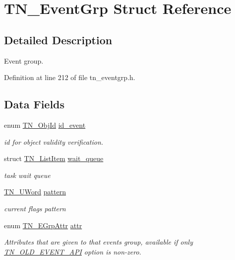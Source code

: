 \hypertarget{structTN__EventGrp}{}\section{T\+N\+\_\+\+Event\+Grp Struct Reference}
\label{structTN__EventGrp}


\subsection{Detailed Description}
Event group. 

Definition at line 212 of file tn\+\_\+eventgrp.\+h.

\subsection*{Data Fields}
\begin{DoxyCompactItemize}
\item 
enum \hyperlink{tn__common_8h_ae779dd1f6735f6e139fb70acd004d976}{T\+N\+\_\+\+Obj\+Id} \hyperlink{structTN__EventGrp_a0bdf55b6117237122efeefcdf6802d37}{id\+\_\+event}
\begin{DoxyCompactList}\small\item\em id for object validity verification. \end{DoxyCompactList}\item 
\mbox{\label{structTN__EventGrp_a93da04331cafe905f9c8b2fa2bad648b}} 
struct \hyperlink{structTN__ListItem}{T\+N\+\_\+\+List\+Item} \hyperlink{structTN__EventGrp_a93da04331cafe905f9c8b2fa2bad648b}{wait\+\_\+queue}
\begin{DoxyCompactList}\small\item\em task wait queue \end{DoxyCompactList}\item 
\mbox{\label{structTN__EventGrp_abf45ee25e11ea46636920be5003cdec2}} 
\hyperlink{tn__arch__example_8h_ab80cba0fe9ffcd9011d53dfeb9e39bf4}{T\+N\+\_\+\+U\+Word} \hyperlink{structTN__EventGrp_abf45ee25e11ea46636920be5003cdec2}{pattern}
\begin{DoxyCompactList}\small\item\em current flags pattern \end{DoxyCompactList}\item 
enum \hyperlink{tn__eventgrp_8h_aca5ed3b60cdaa2e2db8b88f4b5e33d3f}{T\+N\+\_\+\+E\+Grp\+Attr} \hyperlink{structTN__EventGrp_ac247c74950bd8ae6f721ff220e5a2402}{attr}
\begin{DoxyCompactList}\small\item\em Attributes that are given to that events group, available if only {\ttfamily \hyperlink{tn__cfg__default_8h_ac61d5f6a716cdcab205a2c8afbde4242}{T\+N\+\_\+\+O\+L\+D\+\_\+\+E\+V\+E\+N\+T\+\_\+\+A\+PI}} option is non-\/zero. \end{DoxyCompactList}\end{DoxyCompactItemize}


